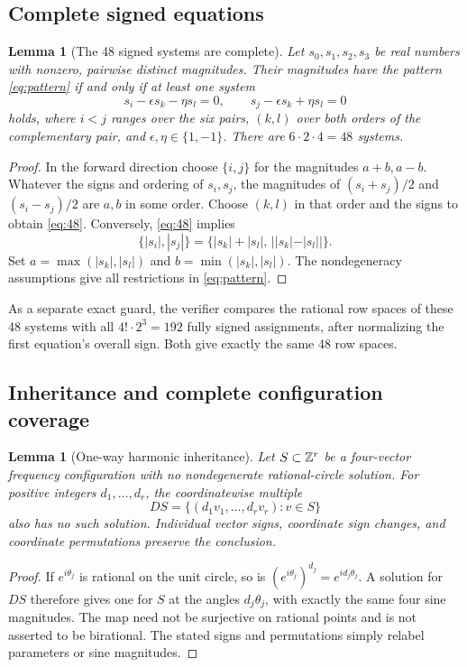 \documentclass[11pt,letterpaper]{article}
\newtheorem{lemma}[theorem]{Lemma}
\theoremstyle{definition}\newtheorem{definition}[theorem]{Definition}
\theoremstyle{remark}\newtheorem{remark}[theorem]{Remark}
\begin{document}
\subsection{Complete signed equations}
\begin{lemma}[The 48 signed systems are complete]\label{lem:48}
Let $s_0,s_1,s_2,s_3$ be real numbers with nonzero, pairwise distinct magnitudes. Their magnitudes have the pattern \eqref{eq:pattern} if and only if at least one system
\begin{equation}\label{eq:48}
s_i-\epsilon s_k-\eta s_l=0,\qquad
s_j-\epsilon s_k+\eta s_l=0
\end{equation}
holds, where $i<j$ ranges over the six pairs, $(k,l)$ over both orders of the complementary pair, and $\epsilon,\eta\in\{1,-1\}$. There are $6\cdot2\cdot4=48$ systems.
\end{lemma}
\begin{proof}
In the forward direction choose $\{i,j\}$ for the magnitudes $a+b,a-b$. Whatever the signs and ordering of $s_i,s_j$, the magnitudes of $(s_i+s_j)/2$ and $(s_i-s_j)/2$ are $a,b$ in some order. Choose $(k,l)$ in that order and the signs to obtain \eqref{eq:48}. Conversely, \eqref{eq:48} implies
\[
\{|s_i|,|s_j|\}=\{|s_k|+|s_l|,\,||s_k|-|s_l||\}.
\]
Set $a=\max(|s_k|,|s_l|)$ and $b=\min(|s_k|,|s_l|)$. The nondegeneracy assumptions give all restrictions in \eqref{eq:pattern}.
\end{proof}
As a separate exact guard, the verifier compares the rational row spaces of these 48 systems with all $4!\cdot2^3=192$ fully signed assignments, after normalizing the first equation's overall sign. Both give exactly the same 48 row spaces.

\subsection{Inheritance and complete configuration coverage}
\begin{lemma}[One-way harmonic inheritance]\label{lem:inherit}
Let $S\subset\mathbb Z^r$ be a four-vector frequency configuration with no nondegenerate rational-circle solution. For positive integers $d_1,\ldots,d_r$, the coordinatewise multiple
\[
D S=\{(d_1v_1,\ldots,d_rv_r):v\in S\}
\]
also has no such solution. Individual vector signs, coordinate sign changes, and coordinate permutations preserve the conclusion.
\end{lemma}
\begin{proof}
If $e^{i\theta_j}$ is rational on the unit circle, so is $(e^{i\theta_j})^{d_j}=e^{i d_j\theta_j}$. A solution for $DS$ therefore gives one for $S$ at the angles $d_j\theta_j$, with exactly the same four sine magnitudes. The map need not be surjective on rational points and is not asserted to be birational. The stated signs and permutations simply relabel parameters or sine magnitudes.
\end{proof}
\end{document}
